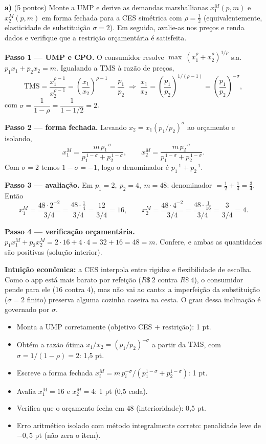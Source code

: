\textbf{a)} (5 pontos) Monte a UMP e derive as demandas marshallianas $x_1^{M}(p,m)$ e $x_2^{M}(p,m)$ em forma fechada para a CES simétrica com $\rho=\tfrac12$ (equivalentemente, elasticidade de substituição $\sigma=2$). Em seguida, avalie-as nos preços e renda dados e verifique que a restrição orçamentária é satisfeita.
\resolucaobox{5.5cm}
\begin{solucao}
\textbf{Passo 1 --- UMP e CPO.} O consumidor resolve $\max\ (x_1^{\rho}+x_2^{\rho})^{1/\rho}$ s.a. $p_1x_1+p_2x_2=m$. Igualando a $\text{TMS}$ à razão de preços,
\[
\text{TMS}=\frac{x_1^{\rho-1}}{x_2^{\rho-1}}=\left(\frac{x_1}{x_2}\right)^{\rho-1}=\frac{p_1}{p_2}\;\Rightarrow\;\frac{x_1}{x_2}=\left(\frac{p_1}{p_2}\right)^{1/(\rho-1)}=\left(\frac{p_1}{p_2}\right)^{-\sigma},
\]
com $\sigma=\dfrac{1}{1-\rho}=\dfrac{1}{1-1/2}=2$.

\textbf{Passo 2 --- forma fechada.} Levando $x_2=x_1(p_1/p_2)^{\sigma}$ ao orçamento e isolando,
\[
x_1^{M}=\frac{m\,p_1^{-\sigma}}{p_1^{\,1-\sigma}+p_2^{\,1-\sigma}},\qquad x_2^{M}=\frac{m\,p_2^{-\sigma}}{p_1^{\,1-\sigma}+p_2^{\,1-\sigma}}.
\]
Com $\sigma=2$ temos $1-\sigma=-1$, logo o denominador é $p_1^{-1}+p_2^{-1}$.

\textbf{Passo 3 --- avaliação.} Em $p_1=2,\ p_2=4,\ m=48$: denominador $=\tfrac12+\tfrac14=\tfrac34$. Então
\[
x_1^{M}=\frac{48\cdot 2^{-2}}{3/4}=\frac{48\cdot \tfrac14}{3/4}=\frac{12}{3/4}=16,\qquad x_2^{M}=\frac{48\cdot 4^{-2}}{3/4}=\frac{48\cdot \tfrac1{16}}{3/4}=\frac{3}{3/4}=4.
\]

\textbf{Passo 4 --- verificação orçamentária.} $p_1x_1^{M}+p_2x_2^{M}=2\cdot16+4\cdot4=32+16=48=m.$ Confere, e ambas as quantidades são positivas (solução interior).

\textbf{Intuição econômica:} a CES interpola entre rigidez e flexibilidade de escolha. Como o app está mais barato por refeição ($R\$~2$ contra $R\$~4$), o consumidor pende para ele ($16$ contra $4$), mas não vai ao canto: a imperfeição da substituição ($\sigma=2$ finito) preserva alguma cozinha caseira na cesta. O grau dessa inclinação é governado por $\sigma$.
\rubricalabel
\begin{itemize}
\item Monta a UMP corretamente (objetivo CES $+$ restrição): 1 pt.
\item Obtém a razão ótima $x_1/x_2=(p_1/p_2)^{-\sigma}$ a partir da $\text{TMS}$, com $\sigma=1/(1-\rho)=2$: 1{,}5 pt.
\item Escreve a forma fechada $x_i^{M}=m\,p_i^{-\sigma}/(p_1^{1-\sigma}+p_2^{1-\sigma})$: 1 pt.
\item Avalia $x_1^{M}=16$ e $x_2^{M}=4$: 1 pt (0{,}5 cada).
\item Verifica que o orçamento fecha em $48$ (interioridade): 0{,}5 pt.
\item Erro aritmético isolado com método integralmente correto: penalidade leve de $-0{,}5$ pt (não zera o item).
\end{itemize}
\end{solucao}

